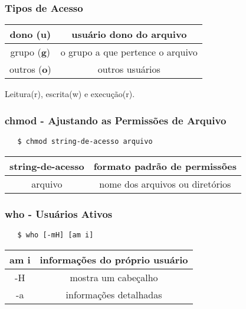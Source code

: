 \documentclass{beamer}
\begin{document}
\begin{frame}
   \frametitle{Tipos de Acesso}
   \begin{table}
      \begin{tabular}{ c | c }
         dono (\textbf{u}) & usuário dono do arquivo \\
         \hline 
         grupo (\textbf{g}) & o grupo a que pertence o arquivo \\ 
         \hline
         outros (\textbf{o}) & outros usuários \\
      \end{tabular}
   \end{table}
   \begin{center}
   Leitura(r), escrita(w) e execução(r).
   \end{center}
\end{frame}

\begin{frame}[fragile]
   \frametitle{chmod - Ajustando as Permissões de Arquivo}
   \begin{verbatim}
   $ chmod string-de-acesso arquivo
   \end{verbatim}
   \begin{table}
      \begin{tabular}{ c | c }
         string-de-acesso & formato padrão de permissões \\
         \hline 
         arquivo & nome dos arquivos ou diretórios\\ 
      \end{tabular}
   \end{table}
\end{frame}

\begin{frame}[fragile]
   \frametitle{who - Usuários Ativos}
   \begin{verbatim}
   $ who [-mH] [am i]
   \end{verbatim}
   \begin{table}
      \begin{tabular}{ c | c }
         am i & informações do próprio usuário \\
         \hline 
         -H & mostra um cabeçalho \\ 
         \hline
	 -a & informações detalhadas \\ 
         \hline
      \end{tabular}
   \end{table}
\end{frame}
\end{document}
